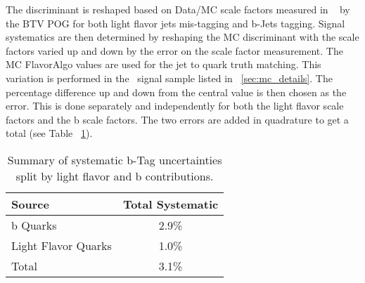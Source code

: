 The discriminant is reshaped based on Data/MC scale factors measured in ~\cite{BTV11003} by the BTV POG for both light flavor jets mis-tagging and b-Jets tagging. Signal systematics are then determined by reshaping the MC discriminant with the scale factors varied up and down by the error on the scale factor measurement. The MC FlavorAlgo values are used for the jet to quark truth matching. This variation is performed in the \ttZ \ signal sample listed in ~\ref{sec:mc_details}. The percentage difference up and down from the central value is then chosen as the error. This is done separately and independently for both the light flavor scale factors and the b scale factors. The two errors are added in quadrature to get a total (see Table ~\ref{tab:systbTag}).


\begin{table}[h]
\begin{center}
\caption{\small\label{tab:systbTag} Summary of systematic b-Tag uncertainties split by light flavor and b contributions.}
\begin{tabular}{lc}\hline
Source & Total Systematic \\ \hline
b Quarks & 2.9\% \\
Light Flavor Quarks & 1.0\% \\ \hline
Total & 3.1\% \\
\hline
\end{tabular}
\end{center}
\end{table}

